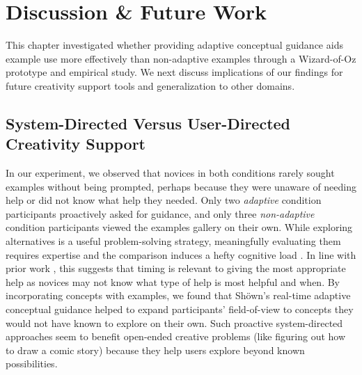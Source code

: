 \section{Discussion \& Future Work}
This chapter investigated whether providing adaptive conceptual guidance aids example use more effectively than non-adaptive examples through a Wizard-of-Oz prototype and empirical study. We next discuss implications of our findings for future creativity support tools and generalization to other domains. 

\subsection{System-Directed Versus User-Directed Creativity Support}
In our experiment, we observed that novices in both conditions rarely sought examples without being prompted, perhaps because they were unaware of needing help or did not know what help they needed. Only two \textit{adaptive} condition participants proactively asked for guidance, and only three \textit{non-adaptive} condition participants viewed the examples gallery on their own. While exploring alternatives is a useful problem-solving strategy, meaningfully evaluating them requires expertise and the comparison induces a hefty cognitive load \cite{tuovinen1999comparison}. In line with prior work \cite{bilalic2008good, Graesser1994,Siangliulue}, this suggests that timing is relevant to giving the most appropriate help as novices may not know what type of help is most helpful and when. By incorporating concepts with examples, we found that Sh{\"o}wn's real-time adaptive conceptual guidance helped to expand participants' field-of-view to concepts they would not have known to explore on their own. Such proactive system-directed approaches seem to benefit open-ended creative problems (like figuring out how to draw a comic story) because they help users explore beyond known possibilities.

